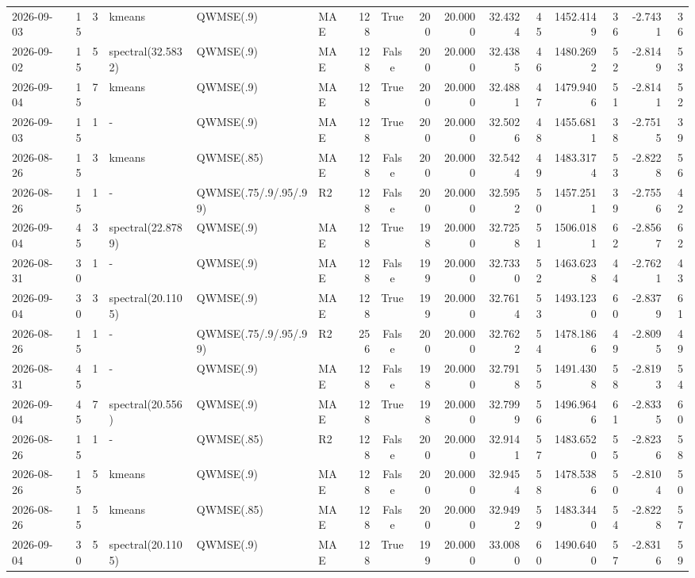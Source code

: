 \documentclass[10pt]{article}
\begin{document}
\begin{landscape}
\begin{longtable}{@{}lrrlllrcrrrrrrrr@{}}
2026-09-03 & 15 & 3 & kmeans & QWMSE(.9) & MAE & 128 & True & 200 & 20.0000 & 32.4324 & 45 & 1452.4149 & 36 & -2.7431 & 36 \\
2026-09-02 & 15 & 5 & spectral(32.5832) & QWMSE(.9) & MAE & 128 & False & 200 & 20.0000 & 32.4385 & 46 & 1480.2692 & 52 & -2.8149 & 53 \\
2026-09-04 & 15 & 7 & kmeans & QWMSE(.9) & MAE & 128 & True & 200 & 20.0000 & 32.4881 & 47 & 1479.9406 & 51 & -2.8141 & 52 \\
2026-09-03 & 15 & 1 & - & QWMSE(.9) & MAE & 128 & True & 200 & 20.0000 & 32.5026 & 48 & 1455.6811 & 38 & -2.7515 & 39 \\
2026-08-26 & 15 & 3 & kmeans & QWMSE(.85) & MAE & 128 & False & 200 & 20.0000 & 32.5424 & 49 & 1483.3174 & 53 & -2.8228 & 56 \\
2026-08-26 & 15 & 1 & - & QWMSE(.75/.9/.95/.99) & R2 & 128 & False & 200 & 20.0000 & 32.5952 & 50 & 1457.2511 & 39 & -2.7556 & 42 \\
2026-09-04 & 45 & 3 & spectral(22.8789) & QWMSE(.9) & MAE & 128 & True & 198 & 20.0000 & 32.7258 & 51 & 1506.0181 & 62 & -2.8567 & 62 \\
2026-08-31 & 30 & 1 & - & QWMSE(.9) & MAE & 128 & False & 199 & 20.0000 & 32.7330 & 52 & 1463.6238 & 44 & -2.7621 & 43 \\
2026-09-04 & 30 & 3 & spectral(20.1105) & QWMSE(.9) & MAE & 128 & True & 199 & 20.0000 & 32.7614 & 53 & 1493.1230 & 60 & -2.8379 & 61 \\
2026-08-26 & 15 & 1 & - & QWMSE(.75/.9/.95/.99) & R2 & 256 & False & 200 & 20.0000 & 32.7622 & 54 & 1478.1866 & 49 & -2.8095 & 49 \\
2026-08-31 & 45 & 1 & - & QWMSE(.9) & MAE & 128 & False & 198 & 20.0000 & 32.7918 & 55 & 1491.4308 & 58 & -2.8193 & 54 \\
2026-09-04 & 45 & 7 & spectral(20.556) & QWMSE(.9) & MAE & 128 & True & 198 & 20.0000 & 32.7999 & 56 & 1496.9646 & 61 & -2.8335 & 60 \\
2026-08-26 & 15 & 1 & - & QWMSE(.85) & R2 & 128 & False & 200 & 20.0000 & 32.9141 & 57 & 1483.6520 & 55 & -2.8236 & 58 \\
2026-08-26 & 15 & 5 & kmeans & QWMSE(.9) & MAE & 128 & False & 200 & 20.0000 & 32.9454 & 58 & 1478.5386 & 50 & -2.8104 & 50 \\
2026-08-26 & 15 & 5 & kmeans & QWMSE(.85) & MAE & 128 & False & 200 & 20.0000 & 32.9492 & 59 & 1483.3440 & 54 & -2.8228 & 57 \\
2026-09-04 & 30 & 5 & spectral(20.1105) & QWMSE(.9) & MAE & 128 & True & 199 & 20.0000 & 33.0080 & 60 & 1490.6400 & 57 & -2.8316 & 59 \\

\end{longtable}
\end{landscape}
\end{document}
